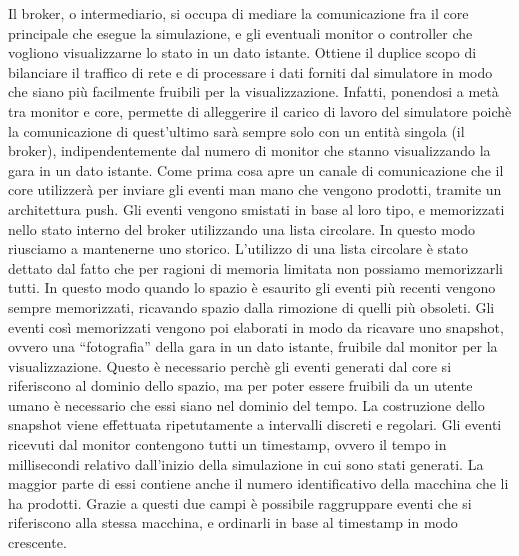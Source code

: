 Il broker, o intermediario, si occupa di mediare la comunicazione fra il core principale che esegue la simulazione, e gli eventuali monitor o controller che vogliono visualizzarne lo stato in un dato istante. Ottiene il duplice scopo di bilanciare il traffico di rete e di processare i dati forniti dal simulatore in modo che siano più facilmente fruibili per la visualizzazione. Infatti, ponendosi a metà tra monitor e core, permette di alleggerire il carico di lavoro del simulatore poichè la comunicazione di quest’ultimo sarà sempre solo con un entità singola (il broker), indipendentemente dal numero di monitor che stanno visualizzando la gara in un dato istante.
Come prima cosa apre un canale di comunicazione che il core utilizzerà per inviare gli eventi man mano che vengono prodotti, tramite un architettura push. Gli eventi vengono smistati in base al loro tipo, e memorizzati nello stato interno del broker utilizzando una lista circolare. In questo modo riusciamo a mantenerne uno storico. L’utilizzo di una lista circolare è stato dettato dal fatto che per ragioni di memoria limitata non possiamo memorizzarli tutti. In questo modo quando lo spazio è esaurito gli eventi più recenti vengono sempre memorizzati, ricavando spazio dalla rimozione di quelli più obsoleti.
Gli eventi così memorizzati vengono poi elaborati in modo da ricavare uno snapshot, ovvero una “fotografia” della gara in un dato istante, fruibile dal monitor per la visualizzazione. Questo è necessario perchè gli eventi generati dal core si riferiscono al dominio dello spazio, ma per poter essere fruibili da un utente umano è necessario che essi siano nel dominio del tempo.
La costruzione dello snapshot viene effettuata ripetutamente a intervalli discreti e regolari.
Gli eventi ricevuti dal monitor contengono tutti un timestamp, ovvero il tempo in millisecondi relativo dall’inizio della simulazione in cui sono stati generati. La maggior parte di essi contiene anche il numero identificativo della macchina che li ha prodotti. Grazie a questi due campi è possibile raggruppare eventi che si riferiscono alla stessa macchina, e ordinarli in base al timestamp in modo crescente.

